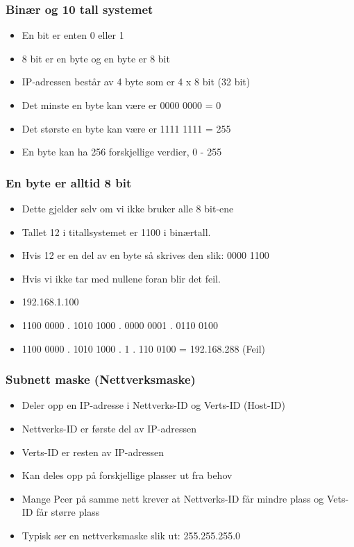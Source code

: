\documentclass[aspectratio=169,xcolor=dvipsnames]{beamer}
\begin{document}
\begin{frame}
	\frametitle{Binær og 10 tall systemet}

			\begin{itemize}
				\item En bit er enten 0 eller 1
				\item 8 bit er en byte og en byte er 8 bit
				\item IP-adressen består av 4 byte som er 4 x 8 bit (32 bit)
				\item Det minste en byte kan være er 0000 0000 = 0
				\item Det største en byte kan være er 1111 1111 = 255
				\item En byte kan ha 256 forskjellige verdier, 0 - 255
			\end{itemize}
\end{frame}
\begin{frame}
	\frametitle{En byte er alltid 8 bit}
			\begin{itemize}
				\item Dette gjelder selv om vi ikke bruker alle 8 bit-ene
				\item Tallet 12 i titallsystemet er 1100 i binærtall. 
				\item Hvis 12 er en del av en byte så skrives den slik: 0000 1100
				\item Hvis vi ikke tar med nullene foran blir det feil.
				\item 192.168.1.100
				\item 1100 0000 . 1010 1000 . 0000 0001 . 0110 0100
				\item 1100 0000 . 1010 1000 . 1 . 110 0100 = 192.168.288 (Feil)
			\end{itemize}
\end{frame}
\begin{frame}
	\frametitle{Subnett maske (Nettverksmaske)}

			\begin{itemize}
				\item Deler opp en IP-adresse i Nettverks-ID og Verts-ID (Host-ID)
				\item Nettverks-ID er første del av IP-adressen
				\item Verts-ID er resten av IP-adressen
				\item Kan deles opp på forskjellige plasser ut fra behov
				\item Mange Pcer på samme nett krever at Nettverks-ID får mindre plass og Vets-ID får større plass
				\item Typisk ser en nettverksmaske slik ut: 255.255.255.0


			\end{itemize}
\end{frame}
\end{document}

